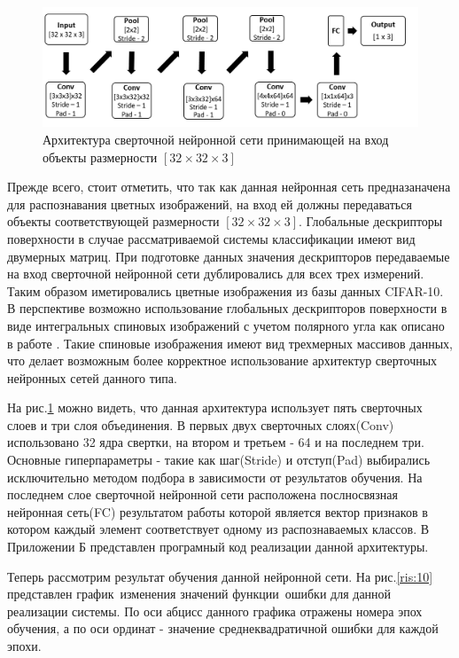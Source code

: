 \documentclass[14pt]{article}
\numberwithin{figure}{section}
\numberwithin{equation}{section}
\begin{document}
\begin{figure}[h]
   \begin{center}
       \includegraphics[scale=0.7] {9.JPG}
       \caption{Архитектура сверточной нейронной сети принимающей на вход объекты размерности $[32 \times 32 \times 3]$}
       \label{ris:9}
   \end{center}
\end{figure}

Прежде всего, стоит отметить, что так как данная нейронная сеть предназаначена для распознавания цветных изображений, на вход ей должны передаваться объекты соответствующей размерности $[32 \times 32 \times 3]$. Глобальные дескрипторы поверхности в случае рассматриваемой системы классификации имеют вид двумерных матриц. При подготовке данных значения дескрипторов передаваемые на вход сверточной нейронной сети дублировались для всех трех измерений. Таким образом иметировались цветные изображения из базы данных CIFAR-10. В перспективе возможно использование глобальных дескрипторов поверхности в виде интегральных спиновых изображений с учетом полярного угла как описано в работе \cite{Chernikoff}. Такие спиновые изображения имеют вид трехмерных массивов данных, что делает возможным более корректное использование архитектур сверточных нейронных сетей данного типа.

На рис.\ref{ris:9} можно видеть, что данная архитектура использует пять сверточных слоев и три слоя объединения. В первых двух сверточных слоях(Conv) использовано 32 ядра свертки, на втором и третьем - 64 и на последнем три. Основные гиперпараметры - такие как шаг(Stride) и отступ(Pad) выбирались исключительно методом подбора в зависимости от результатов обучения. На последнем слое сверточной нейронной сети расположена послносвязная нейронная сеть(FC) результатом работы которой является вектор признаков в котором каждый элемент соответствует одному из распознаваемых классов. В Приложении Б представлен програмный код реализации данной архитектуры.

Теперь рассмотрим результат обучения данной нейронной сети. На рис.\ref{ris:10} представлен график изменения значений функции ошибки для данной реализации системы. По оси абцисс данного графика отражены номера эпох обучения, а по оси ординат - значение среднеквадратичной ошибки для каждой эпохи.
\end{document}
